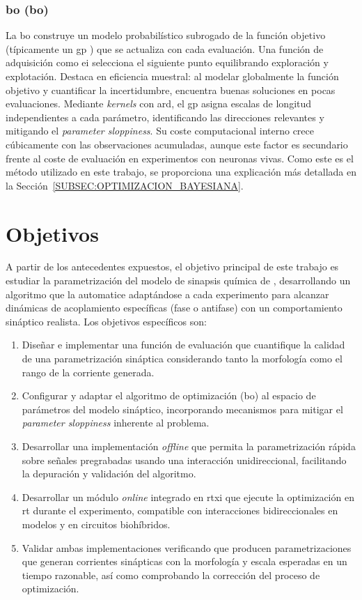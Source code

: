 \subsubsection{\acl{bo} (\acs{bo})}

La \ac{bo} \cite{Shahriari2016} construye un modelo probabilístico subrogado de la función objetivo (típicamente un \ac{gp} \cite{Rasmussen2006}) que se actualiza con cada evaluación. Una función de adquisición como \ac{ei} \cite{Mockus1978} selecciona el siguiente punto equilibrando exploración y explotación. Destaca en eficiencia muestral: al modelar globalmente la función objetivo y cuantificar la incertidumbre, encuentra buenas soluciones en pocas evaluaciones. Mediante \textit{kernels} con \ac{ard}, el \ac{gp} asigna escalas de longitud independientes a cada parámetro, identificando las direcciones relevantes y mitigando el \textit{parameter sloppiness}. Su coste computacional interno crece cúbicamente con las observaciones acumuladas, aunque este factor es secundario frente al coste de evaluación en experimentos con neuronas vivas. Como este es el método utilizado en este trabajo, se proporciona una explicación más detallada en la Sección~\ref{SUBSEC:OPTIMIZACION_BAYESIANA}.

\section{Objetivos\label{SEC:OBJETIVOS}}

A partir de los antecedentes expuestos, el objetivo principal de este trabajo es estudiar la parametrización del modelo de sinapsis química de \cite{Golowasch1999}, desarrollando un algoritmo que la automatice adaptándose a cada experimento para alcanzar dinámicas de acoplamiento específicas (fase o antifase) con un comportamiento sináptico realista. Los objetivos específicos son:

\begin{enumerate}
    \item Diseñar e implementar una función de evaluación que cuantifique la calidad de una parametrización sináptica considerando tanto la morfología como el rango de la corriente generada.
    \item Configurar y adaptar el algoritmo de optimización (\ac{bo}) al espacio de parámetros del modelo sináptico, incorporando mecanismos para mitigar el \textit{parameter sloppiness} inherente al problema.
    \item Desarrollar una implementación \textit{offline} que permita la parametrización rápida sobre señales pregrabadas usando una interacción unidireccional, facilitando la depuración y validación del algoritmo.
    \item Desarrollar un módulo \textit{online} integrado en \ac{rtxi} que ejecute la optimización en \ac{rt} durante el experimento, compatible con interacciones bidireccionales en modelos y en circuitos biohíbridos.
    \item Validar ambas implementaciones verificando que producen parametrizaciones que generan corrientes sinápticas con la morfología y escala esperadas en un tiempo razonable, así como comprobando la corrección del proceso de optimización.
\end{enumerate}
